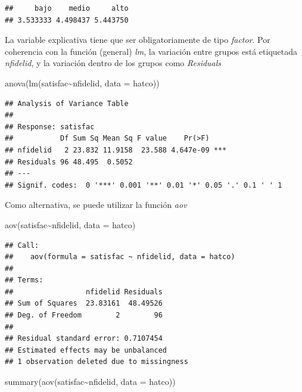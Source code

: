 \documentclass[
]{book}
\newenvironment{Shaded}{\begin{snugshade}}{\end{snugshade}}
\newcommand{\AttributeTok}[1]{\textcolor[rgb]{0.77,0.63,0.00}{#1}}
\newcommand{\FunctionTok}[1]{\textcolor[rgb]{0.00,0.00,0.00}{#1}}
\newcommand{\NormalTok}[1]{#1}
\newcommand{\SpecialCharTok}[1]{\textcolor[rgb]{0.00,0.00,0.00}{#1}}
\theoremstyle{break}
\begin{document}
\begin{verbatim}
##     bajo    medio     alto 
## 3.533333 4.498437 5.443750
\end{verbatim}

La variable explicativa tiene que ser obligatoriamente de tipo \emph{factor}.
Por coherencia con la función (general) \emph{lm}, la variación entre grupos
está etiquetada \emph{nfidelid}, y la variación dentro de los grupos como
\emph{Residuals}

\begin{Shaded}
\begin{Highlighting}[]
\FunctionTok{anova}\NormalTok{(}\FunctionTok{lm}\NormalTok{(satisfac}\SpecialCharTok{\textasciitilde{}}\NormalTok{nfidelid, }\AttributeTok{data =}\NormalTok{ hatco))}
\end{Highlighting}
\end{Shaded}

\begin{verbatim}
## Analysis of Variance Table
## 
## Response: satisfac
##           Df Sum Sq Mean Sq F value    Pr(>F)    
## nfidelid   2 23.832 11.9158  23.588 4.647e-09 ***
## Residuals 96 48.495  0.5052                      
## ---
## Signif. codes:  0 '***' 0.001 '**' 0.01 '*' 0.05 '.' 0.1 ' ' 1
\end{verbatim}

Como alternativa, se puede utilizar la función \emph{aov}

\begin{Shaded}
\begin{Highlighting}[]
\FunctionTok{aov}\NormalTok{(satisfac}\SpecialCharTok{\textasciitilde{}}\NormalTok{nfidelid, }\AttributeTok{data =}\NormalTok{ hatco)}
\end{Highlighting}
\end{Shaded}

\begin{verbatim}
## Call:
##    aov(formula = satisfac ~ nfidelid, data = hatco)
## 
## Terms:
##                 nfidelid Residuals
## Sum of Squares  23.83161  48.49526
## Deg. of Freedom        2        96
## 
## Residual standard error: 0.7107454
## Estimated effects may be unbalanced
## 1 observation deleted due to missingness
\end{verbatim}

\begin{Shaded}
\begin{Highlighting}[]
\FunctionTok{summary}\NormalTok{(}\FunctionTok{aov}\NormalTok{(satisfac}\SpecialCharTok{\textasciitilde{}}\NormalTok{nfidelid, }\AttributeTok{data =}\NormalTok{ hatco))}
\end{Highlighting}
\end{Shaded}
\end{document}
